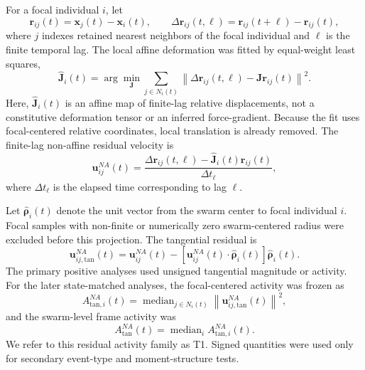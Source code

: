 For a focal individual $i$, let
\begin{equation}
\mathbf{r}_{ij}(t)=\mathbf{x}_j(t)-\mathbf{x}_i(t), \qquad
\Delta\mathbf{r}_{ij}(t,\ell)
=
\mathbf{r}_{ij}(t+\ell)-\mathbf{r}_{ij}(t),
\end{equation}
where $j$ indexes retained nearest neighbors of the focal individual and
$\ell$ is the finite temporal lag. The local affine deformation was fitted by
equal-weight least squares,
\begin{equation}
\hat{\mathbf{J}}_i(t)=
\arg\min_{\mathbf{J}}
\sum_{j\in N_i(t)}
\left\|
\Delta\mathbf{r}_{ij}(t,\ell)
-
\mathbf{J}\mathbf{r}_{ij}(t)
\right\|^2 .
\end{equation}
Here, $\hat{\mathbf{J}}_i(t)$ is an affine map of finite-lag relative
displacements, not a constitutive deformation tensor or an inferred
force-gradient. Because the fit uses focal-centered relative coordinates,
local translation is already removed. The finite-lag non-affine residual
velocity is
\begin{equation}
\mathbf{u}^{NA}_{ij}(t)=
\frac{
\Delta\mathbf{r}_{ij}(t,\ell)
-
\hat{\mathbf{J}}_i(t)\mathbf{r}_{ij}(t)
}{\Delta t_{\ell}},
\end{equation}
where $\Delta t_{\ell}$ is the elapsed time corresponding to lag $\ell$.

Let $\hat{\boldsymbol{\rho}}_i(t)$ denote the unit vector from the swarm center
to focal individual $i$. Focal samples with non-finite or numerically zero
swarm-centered radius were excluded before this projection. The tangential
residual is
\begin{equation}
\mathbf{u}^{NA}_{ij,\mathrm{tan}}(t)=
\mathbf{u}^{NA}_{ij}(t)
-
\left[
\mathbf{u}^{NA}_{ij}(t)\cdot\hat{\boldsymbol{\rho}}_i(t)
\right]
\hat{\boldsymbol{\rho}}_i(t).
\end{equation}
The primary positive analyses used unsigned tangential magnitude or activity.
For the later state-matched analyses, the focal-centered activity was frozen
as
\begin{equation}
A^{NA}_{\mathrm{tan},i}(t)=
\operatorname{median}_{j\in N_i(t)}
\left\|
\mathbf{u}^{NA}_{ij,\mathrm{tan}}(t)
\right\|^2,
\end{equation}
and the swarm-level frame activity was
\begin{equation}
A^{NA}_{\mathrm{tan}}(t)=
\operatorname{median}_{i} A^{NA}_{\mathrm{tan},i}(t).
\end{equation}
We refer to this residual activity family as T1. Signed quantities were used
only for secondary event-type and moment-structure tests.
